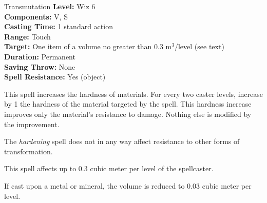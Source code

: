 {Transmutation}
{
	\textbf{Level:} Wiz 6\\	
	\textbf{Components:} V, S\\	
	\textbf{Casting Time:} 1 standard action\\	
	\textbf{Range:} Touch\\	
	\textbf{Target:} One item of a volume no greater than 0.3 m$^3$/level (see text)\\	
	\textbf{Duration:} Permanent\\	
	\textbf{Saving Throw:} None\\	
	\textbf{Spell Resistance:} Yes (object)\\
}
{
	This spell increases the hardness of materials. For every two caster levels, increase by 1 the hardness of the material targeted by the spell. This hardness increase improves only the material's resistance to damage. Nothing else is modified by the improvement.

	The \emph{hardening} spell does not in any way affect resistance to other forms of transformation.

	This spell affects up to 0.3 cubic meter per level of the spellcaster.

	If cast upon a metal or mineral, the volume is reduced to 0.03 cubic meter per level.
}